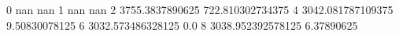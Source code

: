 0 nan nan
1 nan nan
2 3755.3837890625 722.810302734375
4 3042.081787109375 9.50830078125
6 3032.573486328125 0.0
8 3038.952392578125 6.37890625
